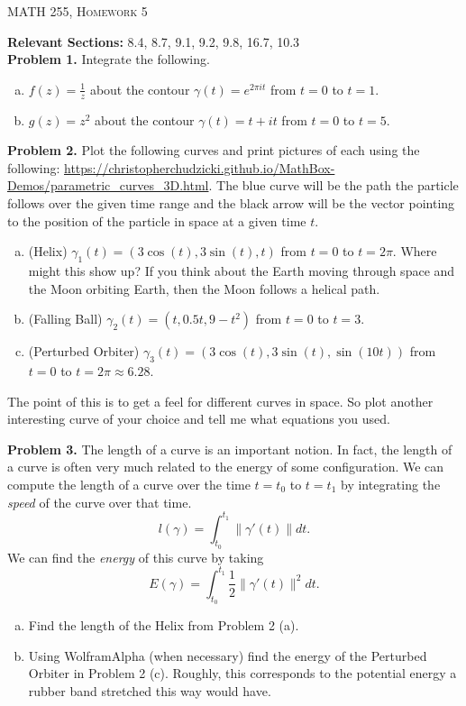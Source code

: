 \documentclass[12pt]{report} %
\theoremstyle{definition}
\begin{document}
\begin{center}
   \textsc{\large MATH 255, Homework 5}\\
\end{center}
\vspace{.5cm}

\noindent\textbf{Relevant Sections:} 8.4, 8.7, 9.1, 9.2, 9.8, 16.7, 10.3 \\

\noindent\textbf{Problem 1.} Integrate the following.
\begin{enumerate}[(a)]
    \item $f(z)=\frac{1}{z}$ about the contour $\gamma(t)=e^{2\pi it}$ from $t=0$ to $t=1$.
    \item $g(z)=z^2$ about the contour $\gamma(t)=t+it$ from $t=0$ to $t=5$.
\end{enumerate}
\vspace*{.5cm}

\noindent\textbf{Problem 2.} Plot the following curves and print pictures of each using the following: \url{https://christopherchudzicki.github.io/MathBox-Demos/parametric_curves_3D.html}. The blue curve will be the path the particle follows over the given time range and the black arrow will be the vector pointing to the position of the particle in space at a given time $t$.
\begin{enumerate}[(a)]
    \item (Helix) $\gamma_1(t)=(3\cos(t),3\sin(t),t)$ from $t=0$ to $t=2\pi$. Where might this show up? If you think about the Earth moving through space and the Moon orbiting Earth, then the Moon follows a helical path.
    \item (Falling Ball) $\gamma_2(t)=(t,0.5t, 9-t^2)$ from $t=0$ to $t=3$.
    \item (Perturbed Orbiter) $\gamma_3(t)=(3\cos(t),3\sin(t),\sin(10t))$ from $t=0$ to $t=2\pi\approx 6.28$. 
\end{enumerate}
The point of this is to get a feel for different curves in space.  So plot another interesting curve of your choice and tell me what equations you used.
\vspace*{.5cm}

\noindent\textbf{Problem 3.} The length of a curve is an important notion.  In fact, the length of a curve is often very much related to the energy of some configuration.  We can compute the length of a curve over the time $t=t_0$ to $t=t_1$ by integrating the \emph{speed} of the curve over that time. 
\[
l(\gamma)= \int_{t_0}^{t_1} \|\gamma'(t)\|dt.
\]
We can find the \emph{energy} of this curve by taking
\[
E(\gamma)= \int_{t_0}^{t_1} \frac{1}{2}\|\gamma'(t)\|^2dt.
\]
\begin{enumerate}[(a)]
    \item Find the length of the Helix from Problem 2 (a). 
    \item Using WolframAlpha (when necessary) find the energy of the Perturbed Orbiter in Problem 2 (c). Roughly, this corresponds to the potential energy a rubber band stretched this way would have. 
\end{enumerate}
\end{document}
